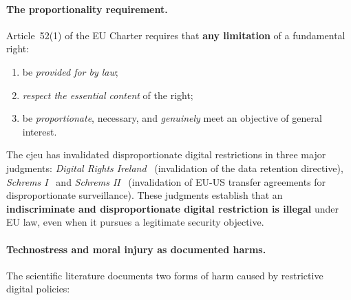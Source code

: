 \paragraph{The proportionality requirement.}

Article~52(1) of the EU Charter requires that \textbf{any
limitation} of a fundamental right:
\begin{enumerate}[nosep]
    \item be \emph{provided for by law};
    \item \emph{respect the essential content} of the right;
    \item be \emph{proportionate}, necessary, and \emph{genuinely}
    meet an objective of general interest.
\end{enumerate}

The \gls{cjeu} has invalidated disproportionate digital restrictions in
three major judgments: \emph{Digital Rights Ireland}~\cite{dri2014}
(invalidation of the data retention directive),
\emph{Schrems I}~\cite{schrems2015} and
\emph{Schrems II}~\cite{schrems2020} (invalidation of
EU-US transfer agreements for disproportionate surveillance). These judgments
establish that an \textbf{indiscriminate and
disproportionate digital restriction is illegal} under EU law, even when it
pursues a legitimate security objective.

\paragraph{Technostress and moral injury as documented
harms.}

The scientific literature documents two forms of harm
caused by restrictive digital policies:

